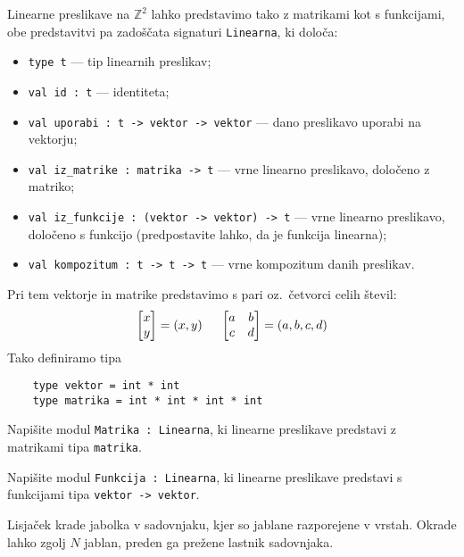 \documentclass[arhiv]{../izpit}
\begin{document}
\naloga[]
  Linearne preslikave na $\mathbb{Z}^2$ lahko predstavimo tako z matrikami kot s
  funkcijami, obe predstavitvi pa zadoščata signaturi \verb|Linearna|, ki določa:
  \begin{itemize}
  \item \verb|type t| --- tip linearnih preslikav;
  \item \verb|val id : t| --- identiteta;
  \item \verb|val uporabi : t -> vektor -> vektor| --- dano preslikavo uporabi na vektorju;
  \item \verb|val iz_matrike : matrika -> t| --- vrne linearno preslikavo, določeno z matriko;
  \item \verb|val iz_funkcije : (vektor -> vektor) -> t| --- vrne linearno preslikavo, določeno s funkcijo (predpostavite lahko, da je funkcija linearna);
  \item \verb|val kompozitum : t -> t -> t| --- vrne kompozitum danih preslikav.
  \end{itemize}
  Pri tem vektorje in matrike predstavimo s pari oz.\ četvorci celih števil:
  \[
  \begin{bmatrix}
      x \\
      y
  \end{bmatrix}
  =
  (x, y)
  \hspace{5mm}
  \begin{bmatrix}
      a & b \\
      c & d
  \end{bmatrix}
  =
  (a, b, c, d)
  \]
  Tako definiramo tipa

  \begin{verbatim}
    type vektor = int * int
    type matrika = int * int * int * int
  \end{verbatim}


\podnaloga
  Napišite modul \verb|Matrika : Linearna|, ki linearne preslikave predstavi
  z matrikami tipa \verb|matrika|.

\podnaloga
  Napišite modul \verb|Funkcija : Linearna|, ki linearne preslikave predstavi
  s funkcijami tipa \verb|vektor -> vektor|.


Lisjaček krade jabolka v sadovnjaku, kjer so jablane razporejene v vrstah.
Okrade lahko zgolj $N$ jablan, preden ga prežene lastnik sadovnjaka.
\end{document}
